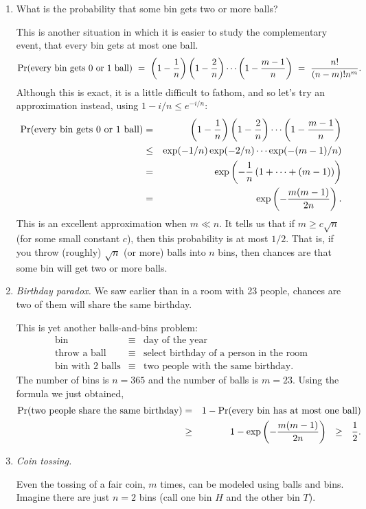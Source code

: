 \begin{enumerate}
\item What is the probability that some bin gets two or more balls?

This is another situation in which it is easier to study the complementary event, that every bin gets at most one ball.
$$
\pr(\mbox{every bin gets $0$ or $1$ ball})
\ = \ 
\left(1 - \frac{1}{n}\right) \left( 1- \frac{2}{n} \right)\cdots \left( 1- \frac{m-1}{n} \right)
\ = \ 
\frac{n!}{(n-m)! n^m}.
$$
Although this is exact, it is a little difficult to fathom, and so let's try an approximation instead, using $1-i/n \leq e^{-i/n}$:
\begin{eqnarray*}
\mbox{\rm Pr}(\mbox{every bin gets $0$ or $1$ ball})
& = & 
\left(1 - \frac{1}{n}\right) \left( 1 - \frac{2}{n} \right) \cdots \left( 1- \frac{m-1}{n} \right) \\
& \leq & \exp(-1/n) \exp(-2/n) \cdots \exp(-(m-1)/n)  \\
& = & 
\exp\left(-\frac{1}{n} \left(1 + \cdots + (m-1) \right) \right) \\
& = &  
\exp\left(-\frac{m(m-1)}{2n} \right).
\end{eqnarray*}
This is an excellent approximation when $m \ll n$. It tells us that if $m \geq c \sqrt{n}$ (for some small constant $c$), then this probability is at most $1/2$. That is, if you throw (roughly) $\sqrt{n}$ (or more) balls into $n$ bins, then chances are that some bin will get two or more balls.

\item {\it Birthday paradox.} We saw earlier than in a room with 23 people, chances are two of them will share the same birthday.

This is yet another balls-and-bins problem:
\begin{eqnarray*}
\mbox{bin} & \equiv & \mbox{day of the year} \\
\mbox{throw a ball} & \equiv & \mbox{select birthday of a person in the room} \\
\mbox{bin with $2$ balls} & \equiv & \mbox{two people with the same birthday} .
\end{eqnarray*}
The number of bins is $n = 365$ and the number of balls is $m=23$. Using the formula we just obtained,
\begin{eqnarray*}
\pr(\mbox{two people share the same birthday})
& = & 
1 - \pr(\mbox{every bin has at most one ball}) \\
& \geq & 
1 - \exp \left(-\frac{m(m-1)}{2n} \right)
\ \ \geq \ \ 
\frac{1}{2} .
\end{eqnarray*}

\item {\it Coin tossing.}

Even the tossing of a fair coin, $m$ times, can be modeled using balls and bins. Imagine there are just $n=2$ bins (call one bin $H$ and the other bin $T$).
\end{enumerate}

